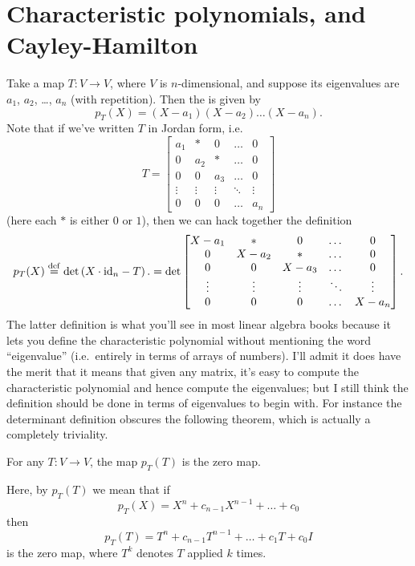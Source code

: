 \section{Characteristic polynomials, and Cayley-Hamilton}
Take a map $T : V \to V$, where $V$ is $n$-dimensional, and suppose its eigenvalues
are $a_1$, $a_2$, \dots, $a_n$ (with repetition).
Then the  is given by
\[
	p_T(X) = (X-a_1)(X-a_2) \dots (X-a_n).
\]
Note that if we've written $T$ in Jordan form, i.e.\ 
\[
	T = \begin{bmatrix}
		a_1 & \ast & 0 & \dots & 0 \\
		0 & a_2 & \ast & \dots & 0 \\
		0 & 0 & a_3 & \dots & 0 \\
		\vdots & \vdots & \vdots & \ddots & \vdots \\
		0 & 0 & 0 & \dots & a_n
	\end{bmatrix}
\]
(here each $\ast$ is either $0$ or $1$),
then we can hack together the definition
\[
	p_T(X) \overset{\mathrm{def}}{=}
	\det \left( X \cdot \mathrm{id}_n - T \right).
	=
	\det \begin{bmatrix}
		X - a_1 & \ast & 0 & \dots & 0 \\
		0 & X - a_2 & \ast & \dots & 0 \\
		0 & 0 & X - a_3 & \dots & 0 \\
		\vdots & \vdots & \vdots & \ddots & \vdots \\
		0 & 0 & 0 & \dots & X - a_n
	\end{bmatrix}.
\]
The latter definition is what you'll see in most
linear algebra books because it lets you define the characteristic polynomial
without mentioning the word ``eigenvalue''
(i.e.\ entirely in terms of arrays of numbers).
I'll admit it does have the merit that it means that given any matrix,
it's easy to compute the characteristic polynomial and hence
compute the eigenvalues;
but I still think the definition should be done in terms of
eigenvalues to begin with.
For instance the determinant definition obscures the following theorem,
which is actually a completely triviality.
\begin{theorem}
	For any $T : V \to V$,
	the map $p_T(T)$ is the zero map.
\end{theorem}
Here, by $p_T(T)$ we mean that if \[ p_T(X) = X^n + c_{n-1} X^{n-1} + \dots + c_0 \]
then \[ p_T(T) = T^n + c_{n-1} T^{n-1} + \dots + c_1 T +  c_0 I \]
is the zero map,
where $T^k$ denotes $T$ applied $k$ times.

